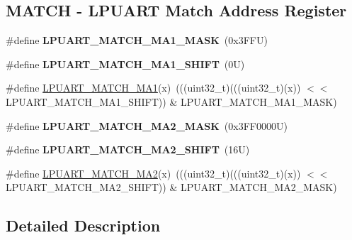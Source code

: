 \subsection*{M\+A\+T\+CH -\/ L\+P\+U\+A\+RT Match Address Register}
\begin{DoxyCompactItemize}
\item 
\mbox{\label{group___l_p_u_a_r_t___register___masks_ga96fef26f8b0b6726a60f32cd01829531}} 
\#define {\bfseries L\+P\+U\+A\+R\+T\+\_\+\+M\+A\+T\+C\+H\+\_\+\+M\+A1\+\_\+\+M\+A\+SK}~(0x3\+F\+F\+U)
\item 
\mbox{\label{group___l_p_u_a_r_t___register___masks_ga651b7f6cd092b5ed316ab295825bad6b}} 
\#define {\bfseries L\+P\+U\+A\+R\+T\+\_\+\+M\+A\+T\+C\+H\+\_\+\+M\+A1\+\_\+\+S\+H\+I\+FT}~(0\+U)
\item 
\#define \mbox{\hyperlink{group___l_p_u_a_r_t___register___masks_ga7f7287892dbd269075db3996d8ba2714}{L\+P\+U\+A\+R\+T\+\_\+\+M\+A\+T\+C\+H\+\_\+\+M\+A1}}(x)~(((uint32\+\_\+t)(((uint32\+\_\+t)(x)) $<$$<$ L\+P\+U\+A\+R\+T\+\_\+\+M\+A\+T\+C\+H\+\_\+\+M\+A1\+\_\+\+S\+H\+I\+FT)) \& L\+P\+U\+A\+R\+T\+\_\+\+M\+A\+T\+C\+H\+\_\+\+M\+A1\+\_\+\+M\+A\+SK)
\item 
\mbox{\label{group___l_p_u_a_r_t___register___masks_ga6390f3953bf0a7b38f2233d5f21e4a65}} 
\#define {\bfseries L\+P\+U\+A\+R\+T\+\_\+\+M\+A\+T\+C\+H\+\_\+\+M\+A2\+\_\+\+M\+A\+SK}~(0x3\+F\+F0000\+U)
\item 
\mbox{\label{group___l_p_u_a_r_t___register___masks_ga88c082aabff6db4033fa0a6e95151b6d}} 
\#define {\bfseries L\+P\+U\+A\+R\+T\+\_\+\+M\+A\+T\+C\+H\+\_\+\+M\+A2\+\_\+\+S\+H\+I\+FT}~(16\+U)
\item 
\#define \mbox{\hyperlink{group___l_p_u_a_r_t___register___masks_gaf3c6dd14c8356512ce94091194f99fb5}{L\+P\+U\+A\+R\+T\+\_\+\+M\+A\+T\+C\+H\+\_\+\+M\+A2}}(x)~(((uint32\+\_\+t)(((uint32\+\_\+t)(x)) $<$$<$ L\+P\+U\+A\+R\+T\+\_\+\+M\+A\+T\+C\+H\+\_\+\+M\+A2\+\_\+\+S\+H\+I\+FT)) \& L\+P\+U\+A\+R\+T\+\_\+\+M\+A\+T\+C\+H\+\_\+\+M\+A2\+\_\+\+M\+A\+SK)
\end{DoxyCompactItemize}


\subsection{Detailed Description}


